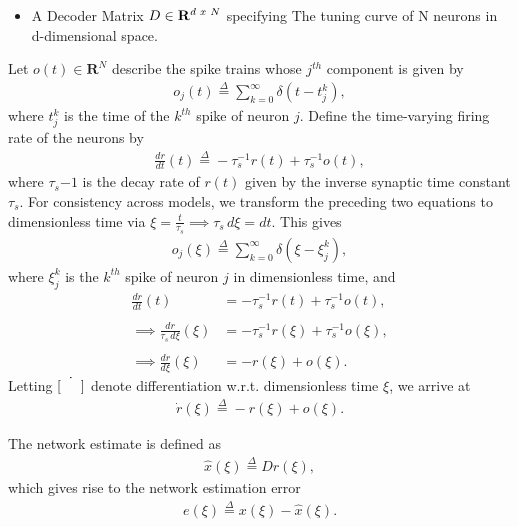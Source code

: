 \begin{enumerate}
\begin{itemize}
    \item A Decoder Matrix $D \in \mathbf{R}^{d\hspace{1mm} x \hspace{1mm}N}$ specifying The tuning curve of N neurons in d-dimensional space. \\
\end{itemize}
Let $o(t) \in \mathbf{R}^{N}$ describe the spike trains whose $j^{th}$ component is given by
\begin{align*}
	o_j(t) \overset{\Delta}{=} \sum_{k=0}^{\infty} \delta(t - t_j^k),
\end{align*} 
where $t_j^k$ is the time of the $k^{th}$ spike of neuron $j$. 
Define the time-varying firing rate of the neurons by 
\begin{align*}
	\frac{d r}{d t}(t) \overset{\Delta}{=} - \tau_s^{-1} r(t) + \tau_s^{-1} o(t),
\end{align*}
where $\tau_s{-1}$ is the decay rate of $r(t)$ given by the inverse synaptic time constant $\tau_s$. For consistency across models, we transform the preceding two equations to dimensionless time via $\xi = \frac{t}{\tau_s} \implies  \tau_s \, d \xi = dt$. This gives
\begin{align}
	\label{eq:analysis:comparison_sc_vs_pcf_vs_gj:pcf_o_def}
	o_j(\xi) \overset{\Delta}{=} \sum_{k=0}^{\infty} \delta(\xi - \xi_j^k),
\end{align}
where $\xi_j^k$ is the $k^{th}$ spike of neuron $j$ in dimensionless time, and
\begin{align*}
	\frac{d r}{d t}(t) &= - \tau_s^{-1} r(t) + \tau_s^{-1}o(t),
	\\
	\\
	\implies
	\frac{d r}{\tau_s \, d \xi}(\xi) &= - \tau_s^{-1} r(\xi) + \tau_s^{-1} o(\xi),
	\\
	\\
	\implies
	\frac{dr}{d\xi}(\xi) &= - r(\xi) + o(\xi).
\end{align*}    
Letting $\dot{\left[ \hspace{5mm} \right]}$ denote differentiation w.r.t. dimensionless time $\xi$, we arrive at 
\begin{align}
\label{eq:analysis:comparison_sc_vs_pcf_vs_gj:pcf_r_def}
\dot{r}(\xi) \overset{\Delta}{=} - r(\xi) + o(\xi). 
\end{align}

The network estimate is defined as 
\begin{align}
\label{eq:analysis:comparison_sc_vs_pcf_vs_gj:pcf_xhat_def}
\hat{x}(\xi) \overset{\Delta}{=} D r(\xi),
\end{align}
which gives rise to the network estimation error
\begin{align}
\label{eq:analysis:comparison_sc_vs_pcf_vs_gj:pcf_error_def}
e(\xi) \overset{\Delta}{=} x(\xi) - \hat{x}(\xi).
\end{align}


\end{enumerate}

